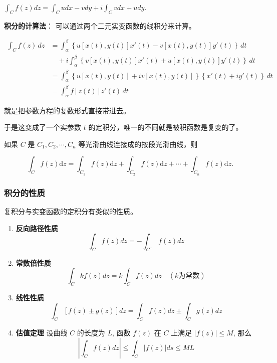 \(\int_C f(z)dz=\int_C udx-vdy+i\int_C vdx+udy\).

\textbf{积分的计算法}： 可以通过两个二元实变函数的线积分来计算。

\begin{align*}
\int_C f(z) \, dz
&= \int_\alpha^\beta \left\{ u[x(t), y(t)] x'(t) - v[x(t), y(t)] y'(t) \right\} \, dt \\
&\quad + i \int_\alpha^\beta \left\{ v[x(t), y(t)] x'(t) + u[x(t), y(t)] y'(t) \right\} \, dt \\
&= \int_\alpha^\beta \left\{ u[x(t), y(t)] + i v[x(t), y(t)] \right\} \left\{ x'(t) + i y'(t) \right\} \, dt \\
&= \boxed{\int_\alpha^\beta f[z(t)] z'(t) \, dt}
\end{align*}

\begin{tcolorbox}[title={Note},colback=red!5!white
,colframe=red!75!black
,colbacktitle=yellow!50!red
,coltitle=red!25!black, fonttitle=\bfseries,subtitle style={boxrule=0.4pt, colback=yellow!50!red!25!white}]
就是把参数方程的复数形式直接带进去。

于是这变成了一个实参数 \(t\) 的定积分，唯一的不同就是被积函数是复变的了。

\end{tcolorbox}

如果 \(C\) 是 \(C_1,C_2,\cdots,C_n\) 等光滑曲线连接成的按段光滑曲线，则

\[
\int_{C} f(z)\mathrm{d} z=\int_{C_{1}} f(z)\mathrm{d} z+\int_{C_{2}} f(z)\mathrm{d} z+\cdots+\int_{C_{n}} f(z)\mathrm{d} z.
\]
\subsubsection{积分的性质}
\label{积分的性质}
复积分与实变函数的定积分有类似的性质。

\begin{enumerate}
\item \textbf{反向路径性质}
\[
   \int_{C} f(z)dz=-\int_{C^{-}}f(z)dz
   \]
\item \textbf{常数倍性质}
\[
   \int_{C} kf(z)dz=k\int_{C} f(z)dz \quad (k 为常数)
   \]
\item \textbf{线性性质}
\[
   \int_{C}[f(z)\pm g(z)]dz=\int_{C}f(z)dz\pm \int_{C}g(z)dz
   \]
\item \textbf{估值定理} 设曲线 \(C\) 的长度为 \(L\), 函数 \(f(z)\) 在 \(C\) 上满足
\(\left |f(z)\right |\leq M\), 那么
\[
   \left|\int_{C}f(z)dz\right|\leq\int_{C}\left |f(z)\right | ds\leq ML
   \]
\end{enumerate}

